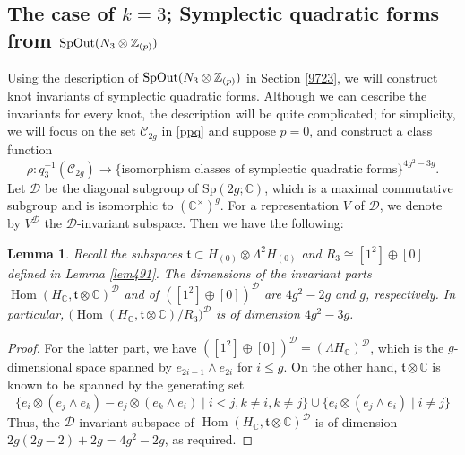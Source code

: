 \documentclass{article}
\theoremstyle{plain}
\newtheorem{lem}[thm]{Lemma}
\theoremstyle{definition}
\def\Hom{\mathop{\mathrm{Hom}}\nolimits}
\newcommand{\ra}{\rightarrow}
\newcommand{\Z}{{\Bbb Z}}
\newcommand{\GL}{{\rm GL}}
\newcommand{\SpOut}{{\rm SpOut}}
\begin{document}
{\subsection{The case of $k=3$; Symplectic quadratic forms from $\SpOut ( N_3 \otimes \Z_{(p)})$}
\label{ooi25}
Using the description of $\SpOut ( N_3 \otimes \Z_{(p)})$ in Section \ref{9723}, we will construct knot invariants of symplectic quadratic forms. Although we can describe the invariants for every knot, the description will be quite complicated; for simplicity, we will focus on the set $\mathcal{C}_{2g} $ in \eqref{ppq} and suppose $p=0$, and construct a class function
\begin{equation}\label{ppq22}\rho: q_3^{-1}(\mathcal{C}_{2g} ) \ra \{ \textrm{isomorphism classes of symplectic quadratic forms}\}^{4g^2-3g }.
\end{equation}Let $\mathcal{D}$ be the diagonal subgroup of $\mathrm{Sp}(2g; \mathbb{C})$, which is a maximal commutative subgroup and is isomorphic to $(\mathbb{C}^\times)^g$.
For a representation $V$ of $\mathcal{D}$, we denote by $V^{\mathcal{D}}$ the $\mathcal{D}$-invariant subspace.
Then we have the following:

\begin{lem}
Recall the subspaces $ \mathfrak{t} \subset H_{(0)}\otimes \Lambda^2 H_{(0)}$ and $R_3 \cong [1^2]\oplus [0]$ defined in Lemma \ref{lem491}. The dimensions of the invariant parts $ \Hom(H_{\mathbb{C}}, \mathfrak{t}\otimes \mathbb{C} )^{\mathcal{D}}$ and of $([1^2]\oplus [0])^{\mathcal{D}}$ are $4g^2 - 2g$ and $g$, respectively. In particular, $\bigl( \Hom(H_{\mathbb{C}}, \mathfrak{t}\otimes \mathbb{C} ) /R_3\bigr)^{\mathcal{D}} $ is  of dimension $4g^2 - 3g $.
\end{lem}
\begin{proof} For the latter part, we have $([1^2]\oplus [0])^{\mathcal{D}} =(\Lambda H_{\mathbb{C}})^{\mathcal{D}}$,
which is the $g$-dimensional space spanned by $e_{2i-1} \wedge e_{2i}$ for $i \leq g$. On the other hand, $\mathfrak{t}\otimes \mathbb{C}$ is known to be spanned by the generating set
\[ \{ e_{i} \otimes (e_j \wedge e_k) - e_{j} \otimes (e_k \wedge e_i) \mid i<j, k \neq i, k \neq j \}
\cup \{ e_{i} \otimes (e_j \wedge e_i)  \mid  i \neq j \}  \]
Thus, the $\mathcal{D}$-invariant subspace of $\Hom(H_{\mathbb{C}}, \mathfrak{t}\otimes \mathbb{C} )^{\mathcal{D}}$ is of dimension $2g(2g-2) + 2g = 4g^2 - 2g$, as required. \end{proof}


}
\end{document}

